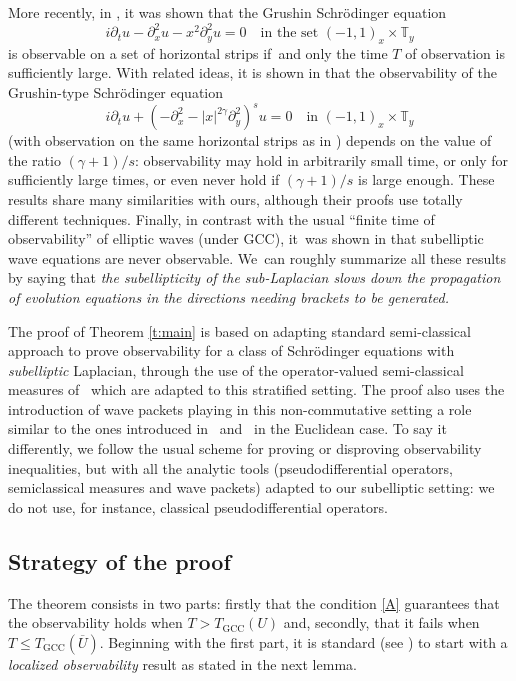 \documentclass[10pt]{amsart}
\newcommand{\GCC}{\mathrm{GCC}}
\theoremstyle{plain}
\theoremstyle{definition}
\def\T{{\mathbb T}}
\begin{document}
More recently, in \cite{BS}, it was shown that the Grushin Schrödinger equation
\[
i\partial_{t}u-\partial_{x}^2u-x^2\partial_{y}^2u=0\quad \text{in the set }(-1,1)_x\times \T_y
\]
is observable on a set of horizontal strips if~and only the time $T$ of observation is sufficiently large. With related ideas, it is shown in \cite{LS} that the observability of the Grushin-type Schrödinger equation
\[
i\partial_{t}u+(-\partial_{x}^2-|x|^{2\gamma}\partial_{y}^2)^su=0\quad \text{in }(-1,1)_x\times \T_y
\]
(with observation on the same horizontal strips as in \cite{BS}) depends on the value of the ratio $(\gamma+1)/s$: observability may hold in arbitrarily small time, or only for sufficiently large times, or even never hold if $(\gamma+1)/s$ is large enough. These results share many similarities with ours, although their proofs use totally different techniques. Finally, in contrast with the usual ``finite time of observability'' of elliptic waves (under GCC), it~was shown in \cite{Let} that subelliptic wave equations are never observable.
We~can roughly summarize all these results by saying that \emph{the subellipticity of the sub-Laplacian slows down the propagation of evolution equations in the directions needing brackets to be generated.}

The proof of Theorem \ref{t:main} is based on adapting standard semi-classical approach to prove observability for a class of Schrödinger equations with \emph{subelliptic} Laplacian, through the use of the operator-valued semi-classical measures of~\cite{FF} which are adapted to this stratified setting. The proof also uses the introduction of wave packets playing in this non-commutative setting a role similar to the ones introduced in~\cite{CR} and~\cite{hag} in the Euclidean case. To say it differently, we follow the usual scheme for proving or disproving observability inequalities, but with all the analytic tools (\hbox{\ie pseudodifferential} operators, semiclassical measures and wave packets) adapted to our subelliptic setting: we do not use, for instance, classical pseudodifferential operators.

\subsection{Strategy of the proof}
The theorem consists in two parts: firstly that the condition \eqref{A} guarantees that the observability holds when $T>T_\GCC(U)$ and, secondly, that it fails when~$T\leq T_\GCC(\overline{U})$. Beginning with the first part,
it is standard (see \cite{Leb}) to start with a \emph{localized observability} result as stated in the next lemma.
\end{document}
